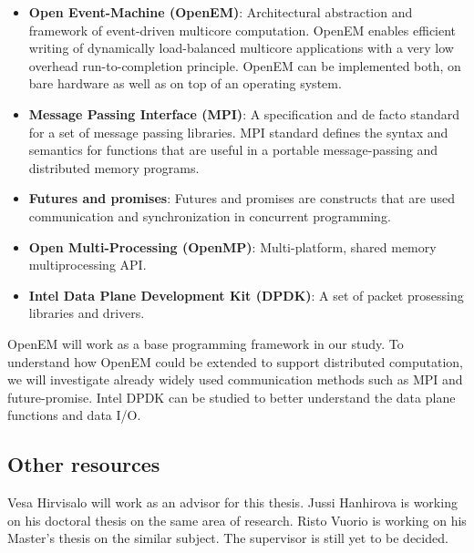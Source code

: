 \begin{itemize}

\item \textbf{Open Event-Machine (OpenEM)}: Architectural abstraction and framework of event-driven multicore computation. OpenEM enables efficient writing of dynamically load-balanced multicore applications with a very low overhead run-to-completion principle. OpenEM can be implemented both, on bare hardware as well as on top of an operating system.
\item \textbf{Message Passing Interface (MPI)}: A specification and de facto standard for a set of message passing libraries. MPI standard defines the syntax and semantics for functions that are useful in a portable message-passing and distributed memory programs.
\item \textbf{Futures and promises}: Futures and promises are constructs that are used communication and synchronization in concurrent programming.
\item \textbf{Open Multi-Processing (OpenMP)}: Multi-platform, shared memory multiprocessing API.
\item \textbf{Intel Data Plane Development Kit (DPDK)}: A set of packet prosessing libraries and drivers.
\end{itemize}

OpenEM will work as a base programming framework in our study. To understand how OpenEM could be extended to support distributed computation, we will investigate already widely used communication methods such as MPI and future-promise. Intel DPDK can be studied to better understand the data plane functions and data I/O.

\subsection{Other resources}
Vesa Hirvisalo will work as an advisor for this thesis. Jussi Hanhirova is working on his doctoral thesis on the same area of research. Risto Vuorio is working on his Master's thesis on the similar subject. The supervisor is still yet to be decided.



